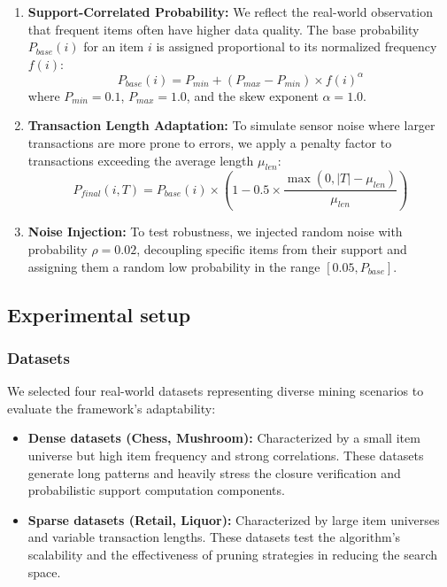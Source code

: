 \documentclass[10pt,letterpaper]{article}
\begin{document}
\begin{enumerate}
    \item \textbf{Support-Correlated Probability:} We reflect the real-world observation that frequent items often have higher data quality. The base probability $P_{base}(i)$ for an item $i$ is assigned proportional to its normalized frequency $f(i)$:
    \begin{equation}
        P_{base}(i) = P_{min} + (P_{max} - P_{min}) \times f(i)^\alpha
    \end{equation}
    where $P_{min}=0.1$, $P_{max}=1.0$, and the skew exponent $\alpha=1.0$.

    \item \textbf{Transaction Length Adaptation:} To simulate sensor noise where larger transactions are more prone to errors, we apply a penalty factor to transactions exceeding the average length $\mu_{len}$:
    \begin{equation}
        P_{final}(i, T) = P_{base}(i) \times \left(1 - 0.5 \times \frac{\max(0, |T| - \mu_{len})}{\mu_{len}}\right)
    \end{equation}

    \item \textbf{Noise Injection:} To test robustness, we injected random noise with probability $\rho=0.02$, decoupling specific items from their support and assigning them a random low probability in the range $[0.05, P_{base}]$.
\end{enumerate}

\subsection*{Experimental setup}

\subsubsection*{Datasets}

We selected four real-world datasets representing diverse mining scenarios to evaluate the framework's adaptability:

\begin{itemize}
    \item \textbf{Dense datasets (Chess, Mushroom):} Characterized by a small item universe but high item frequency and strong correlations. These datasets generate long patterns and heavily stress the closure verification and probabilistic support computation components.
    \item \textbf{Sparse datasets (Retail, Liquor):} Characterized by large item universes and variable transaction lengths. These datasets test the algorithm's scalability and the effectiveness of pruning strategies in reducing the search space.
\end{itemize}
\end{document}
